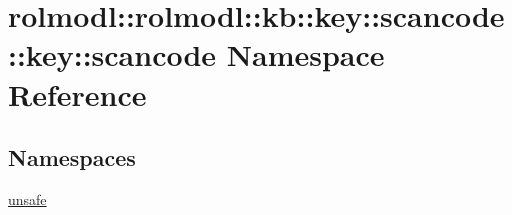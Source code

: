 \hypertarget{namespacerolmodl_1_1rolmodl_1_1kb_1_1key_1_1scancode_1_1key_1_1scancode}{}\section{rolmodl\+::rolmodl\+::kb\+::key\+::scancode\+::key\+::scancode Namespace Reference}
\label{namespacerolmodl_1_1rolmodl_1_1kb_1_1key_1_1scancode_1_1key_1_1scancode}
\subsection*{Namespaces}
\begin{DoxyCompactItemize}
\item 
 \mbox{\hyperlink{namespacerolmodl_1_1rolmodl_1_1kb_1_1key_1_1scancode_1_1key_1_1scancode_1_1unsafe}{unsafe}}
\end{DoxyCompactItemize}
